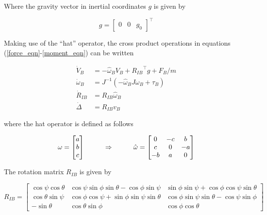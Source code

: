 Where the gravity vector in inertial coordinates $g$ is given by

\begin{equation*}
  g=
  \left[
    \begin{array}{ccc}
      0 & 0 & g_{0}
    \end{array}
  \right]^{\top}
\end{equation*}

Making use of the ``hat'' operator, the cross product operations in equations (\ref{force_eqn}-\ref{moment_eqn}) can be written

\begin{align*}
  \dot{V}_{B}&=-\hat{\omega}_{B}V_{B}+{R_{IB}}^{\top}g+F_{B}/m \\
  \dot{\omega}_{B}&=J^{-1}(-\hat{\omega}_{B}J\omega_{B}+\tau_{B}) \\
  \dot{R}_{IB}&=R_{IB}\hat{\omega}_{B} \\
  \dot{\Delta}&=R_{IB}v_{B}
\end{align*}

where the hat operator is defined as follows

\begin{equation*}
  \omega=
  \begin{bmatrix}
    a \\
    b \\
    c
  \end{bmatrix}
  \hspace{0.4in}
  \Rightarrow
  \hspace{0.4in}
  \hat{\omega}=
  \begin{bmatrix}
    0 & -c & b \\
    c & 0 & -a \\
    -b & a & 0
  \end{bmatrix}
\end{equation*}

The rotation matrix $R_{IB}$ is given by

\begin{equation*}
  R_{IB}=
  \begin{bmatrix}
    \cos{\psi}\cos{\theta} & \cos{\psi}\sin{\phi}\sin{\theta}-\cos{\phi}\sin{\psi} & \sin{\phi}\sin{\psi}+\cos{\phi}\cos{\psi}\sin{\theta} \\
    \cos{\theta}\sin{\psi} & \cos{\phi}\cos{\psi}+\sin{\phi}\sin{\psi}\sin{\theta} & \cos{\phi}\sin{\psi}\sin{\theta}-\cos{\psi}\sin{\phi} \\
    -\sin{\theta} & \cos{\theta}\sin{\phi} & \cos{\phi}\cos{\theta}
  \end{bmatrix}
\end{equation*}

